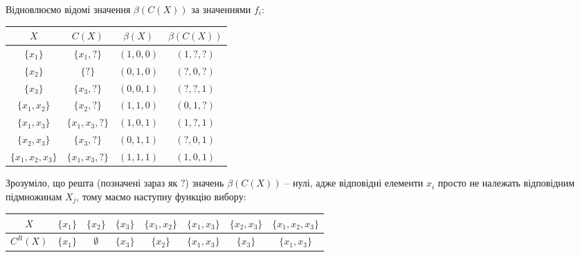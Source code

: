 \begin{solution}
    Відновлюємо відомі значення $\beta(C(X))$ за значеннями $f_i$:
    \begin{table}[H]
        \centering
        \begin{tabular}{|c|c|c|c|}
            \hline 
            $X$ & $C(X)$ & $\beta(X)$ & $\beta(C(X))$ \\ \hline
            $\{x_1\}$ & $\{x_1, ?\}$ & $(1, 0, 0)$ & $(1, ?, ?)$ \\
            $\{x_2\}$ & $\{?\}$ & $(0, 1, 0)$ & $(?, 0, ?)$ \\
            $\{x_3\}$ & $\{x_3, ?\}$ & $(0, 0, 1)$ & $(?, ?, 1)$ \\
            $\{x_1, x_2\}$ & $\{x_2, ?\}$ & $(1, 1, 0)$ & $(0, 1, ?)$ \\
            $\{x_1, x_3\}$ & $\{x_1, x_3, ?\}$ & $(1, 0, 1)$ & $(1, ?, 1)$ \\
            $\{x_2, x_3\}$ & $\{x_3, ?\}$ & $(0, 1, 1)$ & $(?, 0, 1)$ \\
            $\{x_1, x_2, x_3\}$ & $\{x_1, x_3, ?\}$ & $(1, 1, 1)$ & $(1, 0, 1)$ \\ \hline
        \end{tabular}
    \end{table}
    
    Зрозуміло, що решта (позначені зараз як $?$) значень $\beta(C(X))$ -- нулі, адже відповідні елементи $x_i$ просто не належать відповідним підмножинам $X_j$, тому маємо наступну функцію вибору:
    
    \begin{table}[H]
        \centering
        \begin{tabular}{|c|c|c|c|c|c|c|c|}
            \hline
            $X$ & $\{x_1\}$ & $\{x_2\}$ & $\{x_3\}$ & $\{x_1, x_2\}$ & $\{x_1, x_3\}$ & $\{x_2, x_3\}$ & $\{x_1, x_2, x_3\}$ \\ \hline
            $C^R(X)$ & $\{x_1\}$ & $\emptyset$ & $\{x_3\}$ & $\{x_2\}$ & $\{x_1, x_3\}$ & $\{x_3\}$ & $\{x_1, x_3\}$ \\ \hline
        \end{tabular}
    \end{table}
\end{solution}


